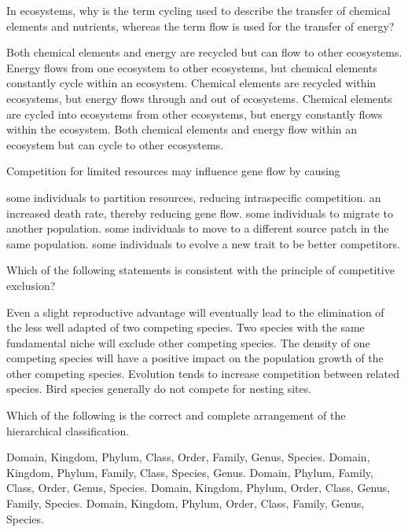 \question
In ecosystems, why is the term cycling used to describe the transfer of chemical elements and nutrients, whereas the term flow is used for the transfer of energy?

\begin{choices}
\choice Both chemical elements and energy are recycled but can flow to other ecosystems.
\choice Energy flows from one ecosystem to other ecosystems, but chemical elements constantly cycle within an ecosystem.
\correctchoice Chemical elements are recycled within ecosystems, but energy flows through and out of ecosystems.
\choice Chemical elements are cycled into ecosystems from other ecosystems, but energy constantly flows within the ecosystem.
\choice Both chemical elements and energy flow within an ecosystem but can cycle to other ecosystems.
\end{choices}

\question
Competition for limited resources may influence gene flow by causing

\begin{choices}
\choice  some individuals to partition resources, reducing intraspecific competition.
\choice  an increased death rate, thereby reducing gene flow.
\correctchoice some individuals to migrate to another population.
\choice  some individuals to move to a different source patch in the same population.
\choice  some individuals to evolve a new trait to be better competitors.
\end{choices}

\question
Which of the following statements is consistent with the principle of competitive exclusion?  

\begin{choices}
\correctchoice Even a slight reproductive advantage will eventually lead to the elimination of the less well adapted of two competing species. 
\choice Two species with the same fundamental niche will exclude other competing species.   
\choice The density of one competing species will have a positive impact on the population growth of the other competing species. 
\choice Evolution tends to increase competition between related species.   
\choice Bird species generally do not compete for nesting sites.  
\end{choices}

\question
Which of the following is the correct and complete arrangement of the hierarchical classification. 
\begin{choices}
\correctchoice  Domain, Kingdom, Phylum, Class, Order, Family, Genus, Species.
\choice  Domain, Kingdom, Phylum, Family, Class, Species, Genus.
\choice  Domain, Phylum, Family, Class, Order, Genus, Species.
\choice  Domain, Kingdom, Phylum, Order, Class, Genus, Family, Species.
\choice  Domain, Kingdom, Phylum, Order, Class, Family, Genus, Species.
\end{choices}


